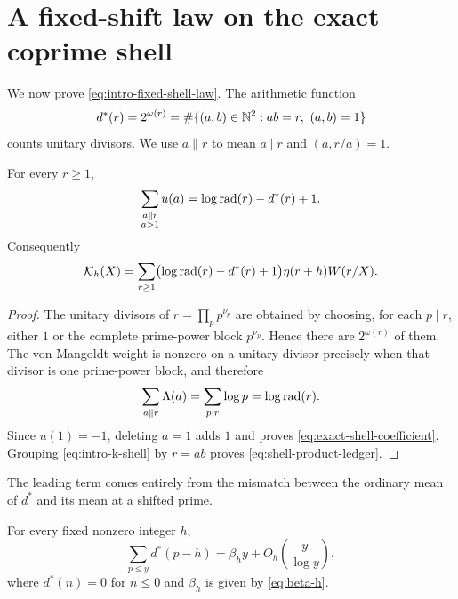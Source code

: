 \section{A fixed-shift law on the exact coprime shell}
\label{sec:fixed-shell}

We now prove \eqref{eq:intro-fixed-shell-law}.  The arithmetic function
\begin{equation}
 d^*(r)=2^{\omega(r)}
 =\#\{(a,b)\in\mathbb N^2:ab=r,\ (a,b)=1\}
 \label{eq:unitary-divisor-function}
\end{equation}
counts unitary divisors.  We use $a\parallel r$ to mean
$a\mid r$ and $(a,r/a)=1$.

\begin{lemma}
\label{lem:exact-shell-coefficient}
For every $r\geq1$,
\begin{equation}
 \sum_{\substack{a\parallel r\\a>1}}u(a)
 =\log\operatorname{rad}(r)-d^*(r)+1.
 \label{eq:exact-shell-coefficient}
\end{equation}
Consequently
\begin{equation}
 \mathcal K_h(X)=
 \sum_{r\geq1}
 \bigl(\log\operatorname{rad}(r)-d^*(r)+1\bigr)
 \eta(r+h)W(r/X).
 \label{eq:shell-product-ledger}
\end{equation}
\end{lemma}

\begin{proof}
The unitary divisors of
$r=\prod_pp^{\nu_p}$ are obtained by choosing, for each $p\mid r$, either
$1$ or the complete prime-power block $p^{\nu_p}$.  Hence there are
$2^{\omega(r)}$ of them.  The von Mangoldt weight is nonzero on a unitary
divisor precisely when that divisor is one prime-power block, and therefore
\[
 \sum_{a\parallel r}\Lambda(a)
 =\sum_{p\mid r}\log p=\log\operatorname{rad}(r).
\]
Since $u(1)=-1$, deleting $a=1$ adds $1$ and proves
\eqref{eq:exact-shell-coefficient}.  Grouping \eqref{eq:intro-k-shell} by
$r=ab$ proves \eqref{eq:shell-product-ledger}.
\end{proof}

The leading term comes entirely from the mismatch between the ordinary
mean of $d^*$ and its mean at a shifted prime.

\begin{theorem}
\label{thm:unitary-titchmarsh-input}
For every fixed nonzero integer $h$,
\begin{equation}
 \sum_{p\leq y}d^*(p-h)
 =\beta_hy+O_h\left(\frac y{\log y}\right),
 \label{eq:unitary-titchmarsh-input}
\end{equation}
where $d^*(n)=0$ for $n\leq0$ and $\beta_h$ is given by
\eqref{eq:beta-h}.
\end{theorem}

